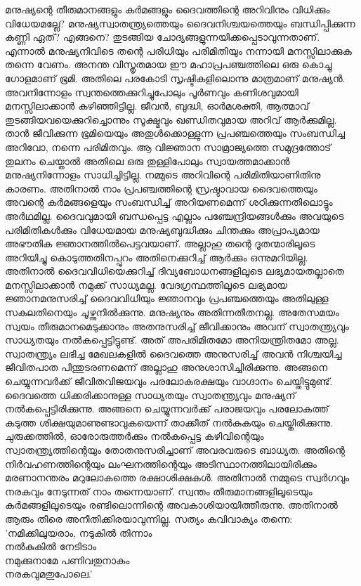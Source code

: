 മനുഷ്യന്റെ തീരുമാനങ്ങളും കര്‍മങ്ങളും ദൈവത്തിന്റെ അറിവിനും വിധിക്കും വിധേയമല്ലേ? മനുഷ്യസ്വാതന്ത്യ്രത്തെയും ദൈവനിശ്ചയത്തെയും ബന്ധിപ്പിക്കുന്ന കണ്ണി ഏത്? എങ്ങനെ? തുടങ്ങിയ ചോദ്യങ്ങളുന്നയിക്കപ്പെടാവുന്നതാണ്. എന്നാല്‍ മനുഷ്യനിവിടെ തന്റെ പരിധിയും പരിമിതിയും നന്നായി മനസ്സിലാക്കുക തന്നെ വേണം. അനന്ത വിസ്തൃതമായ ഈ മഹാപ്രപഞ്ചത്തിലെ ഒരു കൊച്ചു ഗോളമാണ് ഭൂമി. അതിലെ പരകോടി സൃഷ്ടികളിലൊന്നു മാത്രമാണ് മനുഷ്യന്‍. അവനിന്നോളം സ്വന്തത്തെക്കുറിച്ചുപോലും പൂര്‍ണവും കണിശവുമായി മനസ്സിലാക്കാന്‍ കഴിഞ്ഞിട്ടില്ല. ജീവന്‍, ബുദ്ധി, ഓര്‍മശക്തി, ആത്മാവ് തുടങ്ങിയവയെക്കുറിച്ചൊന്നും സൂക്ഷ്മവും ഖണ്ഡിതവുമായ അറിവ് ആര്‍ക്കുമില്ല. താന്‍ ജീവിക്കുന്ന ഭൂമിയെയും അതുള്‍ക്കൊള്ളുന്ന പ്രപഞ്ചത്തെയും സംബന്ധിച്ച അറിവോ, നന്നെ പരിമിതവും. ആ വിജ്ഞാന സാമ്രാജ്യത്തെ സമുദ്രത്തോട് തുലനം ചെയ്താല്‍ അതിലെ ഒരു തുള്ളിപോലും സ്വായത്തമാക്കാന്‍ മനുഷ്യനിന്നോളം സാധിച്ചിട്ടില്ല. നമ്മുടെ അറിവിന്റെ പരിമിതിയാണിതിനു കാരണം. അതിനാല്‍ നാം പ്രപഞ്ചത്തിന്റെ സ്രഷ്ടാവായ ദൈവത്തെയും അവന്റെ കര്‍മങ്ങളെയും സംബന്ധിച്ച് അറിയണമെന്ന് ശഠിക്കുന്നതിലൊട്ടും അര്‍ഥമില്ല. ദൈവവുമായി ബന്ധപ്പെട്ട എല്ലാം പഞ്ചേന്ദ്രിയങ്ങള്‍ക്കും അവയുടെ പരിമിതികള്‍ക്കും വിധേയമായ മനുഷ്യബുദ്ധിക്കും ചിന്തക്കും അപ്രാപ്യമായ അഭൗതിക ജ്ഞാനത്തില്‍പെട്ടവയാണ്. അല്ലാഹു തന്റെ ദൂതന്മാരിലൂടെ അറിയിച്ചു കൊടുത്തതിനപ്പുറം അതിനെക്കുറിച്ച് ആര്‍ക്കും ഒന്നുമറിയില്ല. അതിനാല്‍ ദൈവവിധിയെക്കുറിച്ച് ദിവ്യബോധനങ്ങളിലൂടെ ലഭ്യമായതല്ലാതെ മനസ്സിലാക്കാന്‍ നമുക്ക് സാധ്യമല്ല. വേദഗ്രന്ഥത്തിലൂടെ ലഭ്യമായ ജ്ഞാനമനുസരിച്ച് ദൈവവിധിയും ജ്ഞാനവും പ്രപഞ്ചത്തെയും അതിലുള്ള സകലതിനെയും ചൂഴ്ന്നുനില്‍ക്കുന്നു. മനുഷ്യനും അതിന്നതീതനല്ല. അതേസമയം സ്വയം തീരുമാനമെടുക്കാനും അതനുസരിച്ച് ജീവിക്കാനും അവന് സ്വാതന്ത്യ്രവും സാധ്യതയും നല്‍കപ്പെട്ടിട്ടുണ്ട്. അത് അപരിമിതമോ അനിയന്ത്രിതമോ അല്ല. സ്വാതന്ത്യ്രം ലഭിച്ച മേഖലകളില്‍ ദൈവത്തെ അനുസരിച്ച് അവന്‍ നിശ്ചയിച്ച ജീവിതപാത പിന്തുടരണമെന്ന് അല്ലാഹു അനുശാസിച്ചിരിക്കുന്നു. അങ്ങനെ ചെയ്യുന്നവര്‍ക്ക് ജീവിതവിജയവും പരലോകരക്ഷയും വാഗ്ദാനം ചെയ്തിട്ടുമുണ്ട്. ദൈവത്തെ ധിക്കരിക്കാനുള്ള സാധ്യതയും സ്വാതന്ത്യ്രവും മനുഷ്യന് നല്‍കപ്പെട്ടിരിക്കുന്നു. അങ്ങനെ ചെയ്യുന്നവര്‍ക്ക് പരാജയവും പരലോകത്ത് കടുത്ത ശിക്ഷയുമാണുണ്ടാവുകയെന്ന് താക്കീത് നല്‍കുകയും ചെയ്തിരിക്കുന്നു. ചുരുക്കത്തില്‍, ഓരോരുത്തര്‍ക്കും നല്‍കപ്പെട്ട കഴിവിന്റെയും സ്വാതന്ത്യ്രത്തിന്റെയും തോതനുസരിച്ചാണ് അവരവരുടെ ബാധ്യത. അതിന്റെ നിര്‍വഹണത്തിന്റെയും ലംഘനത്തിന്റെയും അടിസ്ഥാനത്തിലായിരിക്കും മരണാനന്തരം മറുലോകത്തെ രക്ഷാശിക്ഷകള്‍. അതിനാല്‍ നമ്മുടെ സ്വര്‍ഗവും നരകവും നേടുന്നത് നാം തന്നെയാണ്. സ്വന്തം തീരുമാനങ്ങളിലൂടെയും കര്‍മങ്ങളിലൂടെയും രണ്ടിലൊന്നിന്റെ അവകാശിയായിത്തീരുന്നു. അതിനാല്‍ ആരും തീരെ അനീതിക്കിരയാവുന്നില്ല. സത്യം കവിവാക്യം തന്നെ:
'നമിക്കിലുയരാം, നടുകില്‍ തിന്നാം\\
നല്‍കുകില്‍ നേടിടാം \\
നമുക്കുനാമേ പണിവതുനാകം \\
നരകവുമതുപോലെ.'


